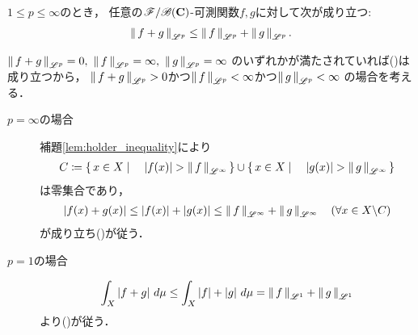 \begin{screen}
	\begin{thm}[Minkowskiの不等式]\label{thm:minkowski_inequality}
		$1 \leq p \leq \infty$のとき，
		任意の$\mathscr{F}/\mathscr{B}(\mathbf{C})$-可測関数$f,g$に対して次が成り立つ:
		\begin{align}
			\left\|\, f+g\, \right\|_{\mathscr{L}^p} \leq \left\|\, f\, \right\|_{\mathscr{L}^p} + \left\|\, g\, \right\|_{\mathscr{L}^p}. \label{ineq:minkowski}
		\end{align}
	\end{thm}
\end{screen}

\begin{prf}
	$\Norm{f+g}{\mathscr{L}^p} = 0,\ \Norm{f}{\mathscr{L}^p} = \infty,\ \Norm{g}{\mathscr{L}^p} = \infty$
	のいずれかが満たされていれば()は成り立つから，
	$\left\|\, f+g\, \right\|_{\mathscr{L}^p} > 0$かつ$\left\|\, f\, \right\|_{\mathscr{L}^p} < \infty$かつ$\left\|\, g\, \right\|_{\mathscr{L}^p} < \infty$
	の場合を考える．
	\begin{description}
		\item[$p = \infty$の場合]
			補題\ref{lem:holder_inequality}により
			\begin{align}
				C \coloneqq \left\{\, x \in X \mid \quad |f(x)| > \left\|\, f\, \right\|_{\mathscr{L}^\infty}\, \right\} \cup \left\{\, x \in X \mid \quad |g(x)| > \left\|\, g\, \right\|_{\mathscr{L}^\infty}\, \right\}
			\end{align}
			は零集合であり，
			\begin{align}
				|f(x) + g(x)| \leq |f(x)| + |g(x)| \leq \left\|\, f\, \right\|_{\mathscr{L}^\infty} + \left\|\, g\, \right\|_{\mathscr{L}^\infty} \quad (\forall x \in X \backslash C)
			\end{align}
			が成り立ち()が従う．
		
		\item[$p = 1$の場合]
			\begin{align}
				\int_X |f + g|\ d\mu \leq \int_X |f| + |g|\ d\mu = \left\|\, f\, \right\|_{\mathscr{L}^1} + \left\|\, g\, \right\|_{\mathscr{L}^1}
			\end{align}
			より()が従う．
		

\end{description}
\end{prf}
